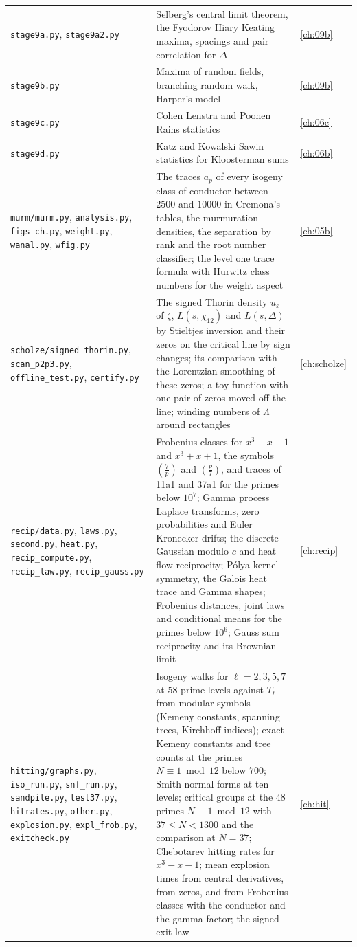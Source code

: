 {\begin{longtable}{p{1.4in}p{2.95in}p{0.6in}}
\texttt{stage9a.py}, \texttt{stage9a2.py} & Selberg's central limit theorem, the Fyodorov Hiary Keating maxima, spacings and pair correlation for $\Delta$ & \ref{ch:09b}\\
\texttt{stage9b.py} & Maxima of random fields, branching random walk, Harper's model & \ref{ch:09b}\\
\texttt{stage9c.py} & Cohen Lenstra and Poonen Rains statistics & \ref{ch:06c}\\
\texttt{stage9d.py} & Katz and Kowalski Sawin statistics for Kloosterman sums & \ref{ch:06b}\\
\texttt{murm/\allowbreak murm.py}, \texttt{analysis.py}, \texttt{figs\_ch.py}, \texttt{weight.py}, \texttt{wanal.py}, \texttt{wfig.py} & The traces $a_p$ of every isogeny class of conductor between $2500$ and $10000$ in Cremona's tables, the murmuration densities, the separation by rank and the root number classifier; the level one trace formula with Hurwitz class numbers for the weight aspect & \ref{ch:05b}\\
\texttt{scholze/\allowbreak signed\_thorin.py}, \texttt{scan\_p2p3.py}, \texttt{offline\_test.py}, \texttt{certify.py} & The signed Thorin density $u_\varepsilon$ of $\zeta$, $L(s,\chi_{12})$ and $L(s,\Delta)$ by Stieltjes inversion and their zeros on the critical line by sign changes; its comparison with the Lorentzian smoothing of these zeros; a toy function with one pair of zeros moved off the line; winding numbers of $\Lambda$ around rectangles & \ref{ch:scholze}\\
\texttt{recip/data.py}, \texttt{laws.py}, \texttt{second.py}, \texttt{heat.py}, \texttt{recip\_compute.py}, \texttt{recip\_law.py}, \texttt{recip\_gauss.py} & Frobenius classes for $x^3-x-1$ and $x^3+x+1$, the symbols $(\frac7p)$ and $(\frac p7)$, and traces of 11a1 and 37a1 for the primes below $10^7$; Gamma process Laplace transforms, zero probabilities and Euler Kronecker drifts; the discrete Gaussian modulo $c$ and heat flow reciprocity; P\'olya kernel symmetry, the Galois heat trace and Gamma shapes; Frobenius distances, joint laws and conditional means for the primes below $10^6$; Gauss sum reciprocity and its Brownian limit & \ref{ch:recip}\\
\texttt{hitting/graphs.py}, \texttt{iso\_run.py}, \texttt{snf\_run.py}, \texttt{sandpile.py}, \texttt{test37.py}, \texttt{hitrates.py}, \texttt{other.py}, \texttt{explosion.py}, \texttt{expl\_frob.py}, \texttt{exitcheck.py} & Isogeny walks for $\ell=2,3,5,7$ at $58$ prime levels against $T_\ell$ from modular symbols (Kemeny constants, spanning trees, Kirchhoff indices); exact Kemeny constants and tree counts at the primes $N\equiv1\bmod12$ below $700$; Smith normal forms at ten levels; critical groups at the $48$ primes $N\equiv1\bmod12$ with $37\le N<1300$ and the comparison at $N=37$; Chebotarev hitting rates for $x^3-x-1$; mean explosion times from central derivatives, from zeros, and from Frobenius classes with the conductor and the gamma factor; the signed exit law & \ref{ch:hit}\\

\end{longtable}}
